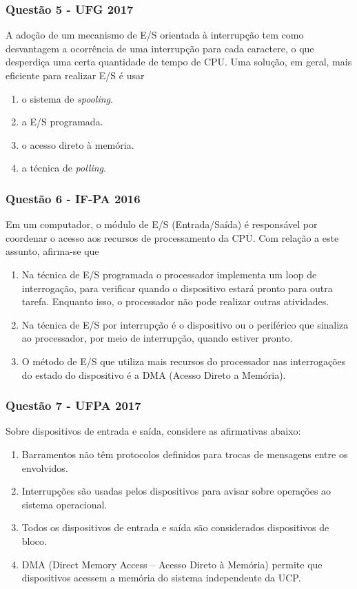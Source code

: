 \documentclass[aspectratio=169,
				xcolor=table]{beamer}
\begin{document}
	\begin{frame}
		\frametitle{Questão 5 - UFG 2017}
		A adoção de um mecanismo de E/S orientada à interrupção tem como desvantagem a ocorrência de uma interrupção para cada caractere, o que desperdiça uma certa quantidade de tempo de CPU. Uma solução, em geral, mais eficiente para realizar E/S é usar
		\vspace{1em}
		\begin{enumerate}[a]
			\item o sistema de \textit{spooling}. 
			\item a E/S programada. 
			\item o acesso direto à memória.
			\item a técnica de \textit{polling}.		
		\end{enumerate}
	\end{frame}
	
	\begin{frame}
		\frametitle{Questão 6 - IF-PA 2016}
		Em um computador, o módulo de E/S (Entrada/Saída) é responsável por coordenar o acesso aos recursos de processamento da CPU. Com relação a este assunto, afirma-se que
		\vspace{1em}
		\begin{enumerate}[I]
			\item Na técnica de E/S programada o processador implementa um loop de interrogação, para verificar quando o dispositivo estará pronto para outra tarefa. Enquanto isso, o processador não pode realizar outras atividades.
			\item Na técnica de E/S por interrupção é o dispositivo ou o periférico que sinaliza ao processador, por meio de interrupção, quando estiver pronto.
			\item O método de E/S que utiliza mais recursos do processador nas interrogações do estado do dispositivo é a DMA (Acesso Direto a Memória).		
		\end{enumerate}
	\end{frame}
	
	\begin{frame}
		\frametitle{Questão 7 - UFPA 2017}
		Sobre dispositivos de entrada e saída, considere as afirmativas abaixo:
		\vspace{1em}
		\begin{enumerate}[I]
			\item Barramentos não têm protocolos definidos para trocas de mensagens entre os envolvidos.

			\item Interrupções são usadas pelos dispositivos para avisar sobre operações ao sistema operacional.

			\item Todos os dispositivos de entrada e saída são considerados dispositivos de bloco.

			\item DMA (Direct Memory Access – Acesso Direto à Memória) permite que dispositivos acessem a memória do sistema independente da UCP.		
		\end{enumerate}
	\end{frame}
	
\end{document}
